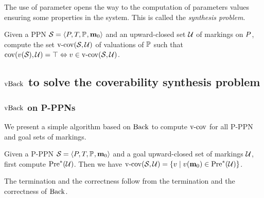 
The use of parameter opens the way to the computation of parameters values ensuring some properties in the system.
This is called the \emph{synthesis problem}.

\begin{defi}
  \label{defi:cov-synth-prblm}
  Given a \ac{PPN} $\defPPN$ and an upward-closed set $\mathcal{U}$ of markings on $P$,
  compute the set $\operatorname{v-cov}(\mathcal{S}_{{}},\mathcal{U})$ of valuations of $\mathbb{P}$
  such that
  $\cov{\val[\namePPN]}{\ucs} = \top \Leftrightarrow \val \in \vcov{\namePPN}{\ucs}$.
\end{defi}

\subsection{$\operatorname{vBack}$ to solve the coverability synthesis problem}

\subsubsection{$\operatorname{vBack}$ on P-PPNs}

We present a simple algorithm based on $\operatorname{Back}$ to compute $\operatorname{v-cov}$ for all P-PPN \namePPN and goal sets of markings.

Given a P-PPN $\defPPN$ and a goal upward-closed set of markings $\mathcal{U}$,
first compute $\operatorname{Pre}^*_{}(\mathcal{U})$.
Then we have
\(
  \vcov{\namePPN}{\ucs} =
  \setComp{\val}{
    \val[\mar_0] \in \pres{\ucs}
  }
\).

The termination and the correctness follow from the termination and the correctness of $\operatorname{Back}$.


